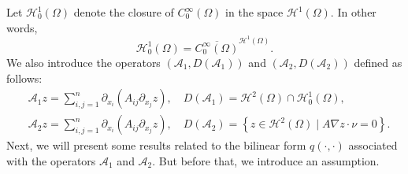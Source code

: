 \documentclass[9pt,reqno]{amsart}
\theoremstyle{plain}
\numberwithin{equation}{section}
\numberwithin{theorem}{section}
\def\Om{\Omega}
\def\Om{\Omega}
\def\mcH{\mathcal{H}}
\begin{document}
	Let $\mathcal{H}_0^1(\Omega)$ denote the closure of $C_0^\infty(\Omega)$ in the space $\mathcal{H}^1(\Omega)$. In other words,
	\begin{equation*}
		\mcH_0^1(\Omega)=\overline{C_0^\infty(\Omega)}^{\mcH^1(\Omega)}.
	\end{equation*} 
	We also introduce the operators $(\mathcal{A}_1,D(\mathcal{A}_1))$ and $(\mathcal{A}_2,D(\mathcal{A}_2))$ defined as follows:
	\begin{equation*}
		\begin{split}
			&\mathcal{A}_1 z= \sum_{i,j=1}^n\partial_{x_i}(A_{ij}\partial_{x_j}z),  \quad D(\mathcal{A}_1) = \mathcal{H}^2 (\Om)\cap \mcH_0^1(\Omega) ,\\
			&\mathcal{A}_2 z= \sum_{i,j=1}^n\partial_{x_i}(A_{ij}\partial_{x_j}z),  \quad D(\mathcal{A}_2) = \left\lbrace z\in \mathcal{H}^2 (\Om) \mid A\nabla z \cdot \nu = 0 \right\rbrace .
		\end{split}
	\end{equation*}
	Next, we will present some results related to the bilinear form $q(\cdot,\cdot)$ associated with the operators $\mathcal{A}_1$ and $\mathcal{A}_2$. But before that, we introduce an assumption.
	
\end{document}
